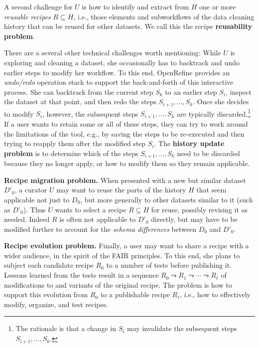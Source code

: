 \documentclass[conference]{ijdc-v14}
\newcommand{\openrefine}{\textrm{OpenRefine}\xspace}
\begin{document}
A second challenge for $U$ is how to identify and extract from $H$ one or more \emph{reusable
  recipes} $R\subseteq H$, i.e., those elements and subworkflows of the data cleaning history that
can be reused for other datasets. We call this the recipe \textbf{reusability problem}.

There are a several other technical challenges worth mentioning: While $U$ is exploring and cleaning
a dataset, she occasionally has to backtrack and undo earlier steps to modify her workflow. To this
end, \openrefine provides an \emph{undo/redo} operation stack to support the back-and-forth of this
interactive process. She can backtrack from the current step $S_k$ to an earlier step $S_i$, inspect
the dataset at that point, and then redo the steps $S_{i+1}, \dots, S_k$. Once she decides to modify
$S_i$, however, the subsequent steps $S_{i+1}, \dots, S_k$ are typically discarded.\footnote{The
  rationale is that a change in $S_i$ may invalidate the subsequent steps $S_{i+1}, \dots, S_k$.} If
a user wants to retain some or all of these steps, they can try to work around the limitations of
the tool, e.g., by saving the steps to be re-executed and then trying to reapply them after the
modified step $S_i$.
The \textbf{history update problem} is to determine which of the steps $S_{i+1}, \dots, S_k$ need to
be discarded because they no longer apply, or how to modify them so they remain applicable.
 
\textbf{Recipe migration problem.} When presented with a new but similar dataset $D'_0$, a curator
$U$ may want to reuse the parts of the history $H$ that seem applicable not just to $D_0$, but more
generally to other datasets similar to it (such as $D'_0$). Thus $U$ wants to select a {recipe}
$R\subseteq H$ for reuse, possibly revising  it as needed. Indeed $R$ is often not applicable to
$D'_0$ directly, but may have to be modified further to account for the \emph{schema
  differences} between $D_0$ and $D'_0$.

\textbf{Recipe evolution problem.} Finally, a user may want to share a recipe with a wider audience,
in the spirit of the FAIR principles. To this end, she plans to subject each candidate recipe $R_0$
to a number of tests before publishing it. Lessons learned from the tests result in a sequence
$R_0\leadsto R_1\leadsto \cdots \leadsto R_{\ell}$ of modifications to and variants of the original
recipe. The problem is how to support this evolution from $R_0$ to a publishable recipe $R_{\ell}$,
i.e., how to effectively modify, organize, and test recipes.
\end{document}

